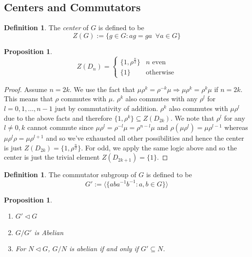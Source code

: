 \documentclass{article}
\newtheorem{proposition}[theorem]{Proposition}
\theoremstyle{definition}
\newtheorem{definition}[theorem]{Definition}
\begin{document}
\subsection{Centers and Commutators}
\begin{definition}
    The \emph{center} of $G$ is defined to be 
    \begin{equation*}
        Z(G) := \{ g\in G: ag=ga \,\,\, \forall a\in G\}
    \end{equation*}
\end{definition}
\begin{proposition}
    \begin{equation*}
        Z(D_n) = \begin{cases}
            \{1,\rho^{\frac{n}{2}}\} &n \text{ even} \\
            \{1\} & \text{otherwise}
        \end{cases}
    \end{equation*}
\end{proposition}
\begin{proof}
    Assume $n =2k$. We use the fact that $\mu \rho^k=\rho^{-k}\mu \Rightarrow \mu \rho^k = \rho^k \mu$ if $n=2k$. This means that $\rho$ commutes with $\mu$. $\rho^k$ also commutes with any $\rho^l$ for $l=0,1,\ldots,n-1$ just by commutativity of addition. $\rho^k$ also commutes with $\mu \rho^l$ due to the above facts and therefore $\{1,\rho^k \} \subseteq Z(D_{2k})$. We note that $\rho^l$ for any $l\neq 0,k$ cannot commute since $\mu \rho^l = \rho^{-l}\mu = \rho^{n-l}\mu$ and $\rho (\mu \rho^l) = \mu \rho^{l-1}$ whereas $\mu\rho^l \rho = \mu\rho^{l+1}$ and so we've exhausted all other possibilities and hence the center is just $Z(D_{2k}) = \{ 1, \rho^{\frac{n}{2}}\}$. For odd, we apply the same logic above and so the center is just the trivial element $Z(D_{2k+1}) = \{1\}$.
\end{proof}
\begin{definition}
    The commutator subgroup of $G$ is defined to be 
    \begin{equation*}
        G' := \langle \{ aba^{-1}b^{-1}:a,b\in G\} \rangle
    \end{equation*}
\end{definition}
\begin{proposition}
    \begin{enumerate}
        \item $G' \lhd G$
        \item $G/G'$ is Abelian 
        \item For $N \lhd G$, $G/N$ is abelian if and only if $G' \subseteq N$.
    \end{enumerate}
\end{proposition}
\end{document}
